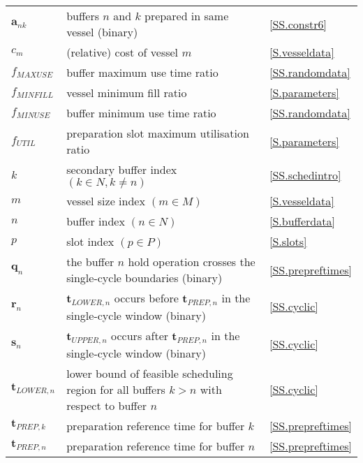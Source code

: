 {\begin{longtabu} to 
     &  & \\\hline
    \endhead
    $\boldsymbol{a}_{nk}$ & buffers $n$ and $k$ prepared in same
    vessel (binary) & \ref{SS.constr6}\\
    $c_{m}$ & (relative) cost of vessel $m$ & \ref{S.vesseldata}\\
    $f_{\mathit{MAXUSE}}$ & buffer maximum use time ratio 
        & \ref{SS.randomdata}\\
    $f_{\mathit{MINFILL}}$ & vessel minimum fill ratio & \ref{S.parameters}\\
    $f_{\mathit{MINUSE}}$ & buffer minimum use time ratio 
        & \ref{SS.randomdata}\\
    $f_{\mathit{UTIL}}$ & preparation slot maximum utilisation ratio
        & \ref{S.parameters}\\
    $k$ & secondary buffer index $\left( k \in N, k \ne n \right)$
        & \ref{SS.schedintro}\\
    $m$ & vessel size index $\left( m \in M \right)$ & \ref{S.vesseldata}\\
    $n$ & buffer index $\left( n \in N \right)$ & \ref{S.bufferdata}\\
    $p$ & slot index $\left( p \in P \right)$ & \ref{S.slots}\\
    $\boldsymbol{q}_{n}$ & the buffer $n$ hold operation crosses the
        single-cycle boundaries (binary) & \ref{SS.prepreftimes}\\
    $\boldsymbol{r}_{n}$ & $\boldsymbol{t}_{\mathit{LOWER},n}$ occurs before
        $\boldsymbol{t}_{\mathit{PREP},n}$ in the single-cycle window (binary)
        & \ref{SS.cyclic}\\
    $\boldsymbol{s}_{n}$ &
        $\boldsymbol{t}_{\mathit{UPPER},n}$ occurs after
        $\boldsymbol{t}_{\mathit{PREP},n}$ in the single-cycle window (binary)
        & \ref{SS.cyclic}\\
    $\boldsymbol{t}_{\mathit{LOWER},n}$ & lower bound of feasible scheduling
        region for all buffers $k > n$ with respect to buffer $n$
        & \ref{SS.cyclic}\\
    $\boldsymbol{t}_{\mathit{PREP},k}$ & preparation reference time for buffer
        $k$ & \ref{SS.prepreftimes}\\
    $\boldsymbol{t}_{\mathit{PREP},n}$ & preparation reference time for buffer
        $n$ & \ref{SS.prepreftimes}\\

\end{longtabu}}
